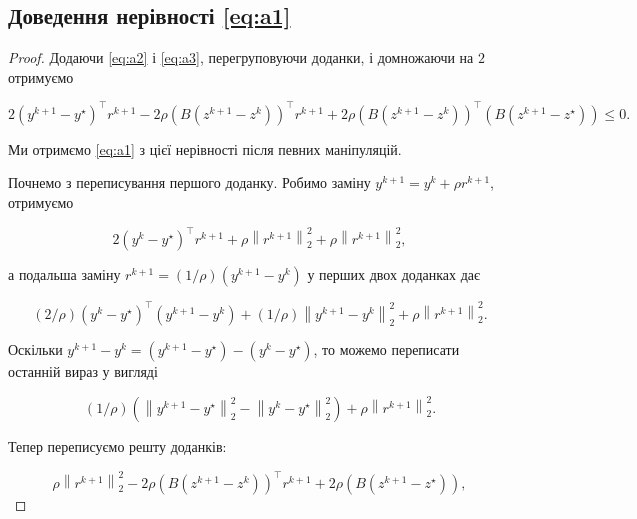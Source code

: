 \subsection*{Доведення нерівності \eqref{eq:a1}}

\begin{proof}
    Додаючи \eqref{eq:a2} і \eqref{eq:a3}, перегруповуючи доданки, і домножаючи на $2$ отримуємо

    \begin{equation}
        \label{eq:a4}
        2 \left( y^{k + 1} - y^\star \right)^\intercal r^{k + 1} - 2 \rho \left( B \left(z^{k + 1} - z^k \right)\right)^\intercal r^{k + 1} + 2 \rho \left( B \left(z^{k + 1} - z^k \right) \right)^\intercal \left( B \left(z^{k + 1} - z^\star \right) \right) \le 0.
    \end{equation}

    Ми отримємо \eqref{eq:a1} з цієї нерівності після певних маніпуляцій. \medskip

    Почнемо з переписування першого доданку. Робимо заміну $y^{k + 1} = y^k + \rho r^{k + 1}$, отримуємо

    \begin{equation*}
        2 \left( y^k - y^\star \right)^\intercal r^{k + 1} + \rho \left\| r^{k + 1} \right\|_2^2 + \rho \left\| r^{k + 1} \right\|_2^2,
    \end{equation*}

    а подальша заміну $r^{k + 1} = (1 / \rho) \left( y^{k + 1} - y^k \right)$ у перших двох доданках дає

    \begin{equation*}
        (2 / \rho) \left( y^k - y^\star \right)^\intercal \left( y^{k + 1} - y^k \right) + (1 / \rho) \left\| y^{k + 1} - y^k \right\|_2^2 + \rho \left\| r^{k + 1} \right\|_2^2.
    \end{equation*}

    Оскільки $y^{k + 1} - y^k = \left( y^{k + 1} - y^\star \right) - \left( y^k - y^\star \right)$, то можемо переписати останній вираз у вигляді

    \begin{equation}
        \label{eq:a5}
        (1 / \rho) \left( \left\| y^{k + 1} - y^\star \right\|_2^2 - \left\| y^k - y^\star \right\|_2^2 \right) + \rho \left\| r^{k + 1} \right\|_2^2.
    \end{equation}

    Тепер переписуємо решту доданків:

    \begin{equation*}
        \rho \left\| r^{k + 1} \right\|_2^2 - 2 \rho \left( B \left( z^{k + 1} - z^k \right) \right)^\intercal r^{k + 1} + 2 \rho \left( B \left( z^{k + 1} - z^\star \right) \right),
    \end{equation*}


\end{proof}
